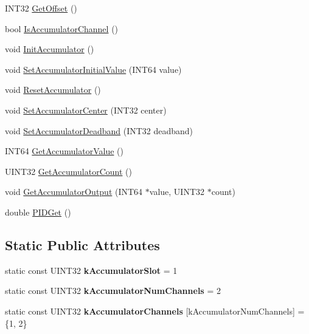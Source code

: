 \begin{DoxyCompactItemize}
\-I\-N\-T32 \hyperlink{classAnalogChannel_a0e2d698faf502d341f16cadad26e39fd}{\-Get\-Offset} ()
\item 
bool \hyperlink{classAnalogChannel_a6915bcc0cb08e270812f31fdf7aa6caa}{\-Is\-Accumulator\-Channel} ()
\item 
void \hyperlink{classAnalogChannel_a8f3c0b9bd0ca7ab9449b89e5c2abd53f}{\-Init\-Accumulator} ()
\item 
void \hyperlink{classAnalogChannel_aae43ed632a10270fd163d44eea2d8f8f}{\-Set\-Accumulator\-Initial\-Value} (\-I\-N\-T64 value)
\item 
void \hyperlink{classAnalogChannel_aecf5da778576f4904e51ece5d327ea17}{\-Reset\-Accumulator} ()
\item 
void \hyperlink{classAnalogChannel_a1e28d604275cfda65b8a5e1b5bd79134}{\-Set\-Accumulator\-Center} (\-I\-N\-T32 center)
\item 
void \hyperlink{classAnalogChannel_ac404eb71545eb04daf9d09c465e0997a}{\-Set\-Accumulator\-Deadband} (\-I\-N\-T32 deadband)
\item 
\-I\-N\-T64 \hyperlink{classAnalogChannel_a8ad12eb79e2ae1c981654ec4907b0f03}{\-Get\-Accumulator\-Value} ()
\item 
\-U\-I\-N\-T32 \hyperlink{classAnalogChannel_a234fa038c75f10ddfc20147740d61dda}{\-Get\-Accumulator\-Count} ()
\item 
void \hyperlink{classAnalogChannel_ae133b8fe46584ea20b35ea3a0294c2bb}{\-Get\-Accumulator\-Output} (\-I\-N\-T64 $\ast$value, \-U\-I\-N\-T32 $\ast$count)
\item 
double \hyperlink{classAnalogChannel_ac6317cfcc26ddff2289f8efc242d99d3}{\-P\-I\-D\-Get} ()
\end{DoxyCompactItemize}
\subsection*{\-Static \-Public \-Attributes}
\begin{DoxyCompactItemize}
\item 
\hypertarget{classAnalogChannel_a5ede081990c971577862f4913f0b89cc}{static const \-U\-I\-N\-T32 {\bfseries k\-Accumulator\-Slot} = 1}\label{classAnalogChannel_a5ede081990c971577862f4913f0b89cc}

\item 
\hypertarget{classAnalogChannel_aa1ecbaa46e972b4d404ce260d58c5c34}{static const \-U\-I\-N\-T32 {\bfseries k\-Accumulator\-Num\-Channels} = 2}\label{classAnalogChannel_aa1ecbaa46e972b4d404ce260d58c5c34}

\item 
\hypertarget{classAnalogChannel_ae83f8b390f6f72a1eb743352e688b7f8}{static const \-U\-I\-N\-T32 {\bfseries k\-Accumulator\-Channels} \mbox{[}k\-Accumulator\-Num\-Channels\mbox{]} = \{1, 2\}}\label{classAnalogChannel_ae83f8b390f6f72a1eb743352e688b7f8}

\end{DoxyCompactItemize}


